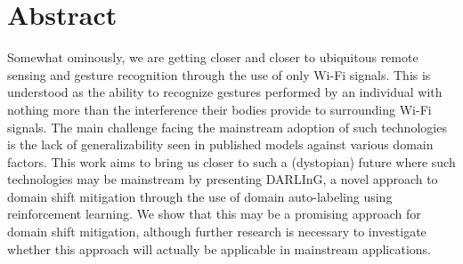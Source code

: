 \chapter*{Abstract}\label{chapter:abstract}

Somewhat ominously, we are getting closer and closer to ubiquitous remote sensing and gesture recognition through the use of only Wi-Fi signals.
This is understood as the ability to recognize gestures performed by an individual with nothing more than the interference their bodies provide to surrounding Wi-Fi signals.
The main challenge facing the mainstream adoption of such technologies is the lack of generalizability seen in published models against various domain factors.
This work aims to bring us closer to such a (dystopian) future where such technologies may be mainstream by presenting DARLInG, a novel approach to domain shift mitigation through the use of domain auto-labeling using reinforcement learning.
We show that this may be a promising approach for domain shift mitigation, although further research is necessary to investigate whether this approach will actually be applicable in mainstream applications.